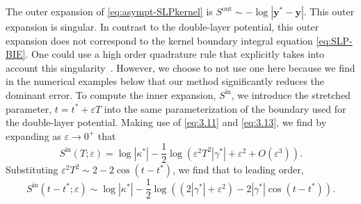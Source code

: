 \documentclass{article}[12pt]
\renewcommand{\epsilon}{\varepsilon}
\numberwithin{equation}{section}
\begin{document}
The outer expansion of \eqref{eq:asympt-SLPkernel} is
$S^{\text{out}} \sim - \log |\mathbf{y^\ast} -\mathbf{y}|$.  
%
  This outer expansion is singular. In contrast to the double-layer
  potential, this outer expansion does not correspond to the kernel
  boundary integral equation \eqref{eq:SLP-BIE}.  One could use a high
  order quadrature rule that explicitly takes into account this
  singularity~\cite{sidi1988quadrature, kress1991boundary}. However,
  we choose to not use one here because we find in the numerical
  examples below that our method significantly reduces the dominant error. 
%
To compute the inner expansion, $S^{\text{in}}$, we introduce the
stretched parameter, $t = t^{\ast} + \epsilon T$ into the same
parameterization of the boundary used for the double-layer
potential. Making use of \eqref{eq:3.11} and \eqref{eq:3.13}, we find
by expanding as $\epsilon \to 0^{+}$ that
\begin{equation}
  S^{\text{in}}(T;\epsilon) = \log | \kappa^{\ast} | - \frac{1}{2}
  \log\left( \epsilon^{2} T^{2} | \gamma^{\ast} | + \epsilon^{2} +
    O(\epsilon^{3}) \right).
  \label{eq:4.7}
\end{equation}
Substituting $\epsilon^{2} T^{2} \sim 2 - 2 \cos( t - t^{\ast} )$, we
find that to leading order,
\begin{equation}
  S^{\text{in}}(t - t^{\ast};\epsilon) \sim \log | \kappa^{\ast} | -
  \frac{1}{2} \log\left( ( 2 | \gamma^{\ast} | + \epsilon^{2} ) - 2 |
    \gamma^{\ast} | \cos( t - t^{\ast}) \right).
  \label{eq:4.8}
\end{equation}
\end{document}

